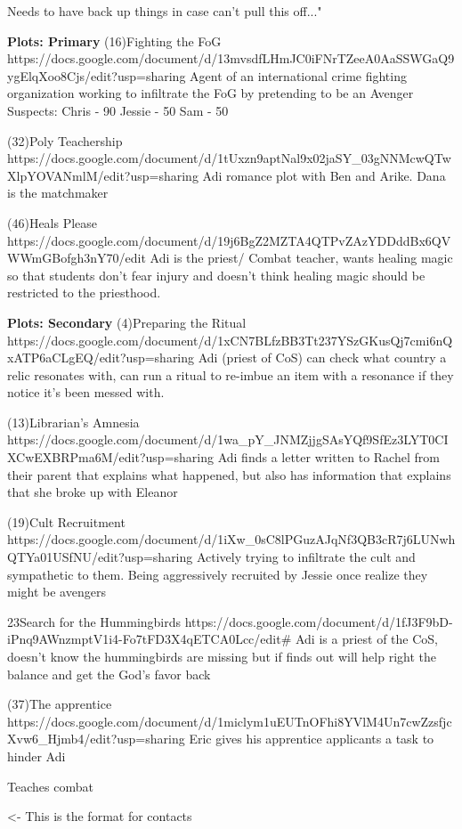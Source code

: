 \documentclass[char]{GL2020}
\begin{document}
Needs to have back up things in case can't pull this off..."

\textbf{Plots: Primary}
(16)Fighting the FoG
https://docs.google.com/document/d/13mvsdfLHmJC0iFNrTZeeA0AaSSWGaQ9ygElqXoo8Cjs/edit?usp=sharing
Agent of an international crime fighting organization working to infiltrate the FoG by pretending to be an Avenger
Suspects:
Chris - 90%
Jessie - 50%
Sam - 50%

(32)Poly Teachership
https://docs.google.com/document/d/1tUxzn9aptNal9x02jaSY_03gNNMcwQTwXlpYOVANmlM/edit?usp=sharing
Adi romance plot with Ben and Arike.  Dana is the matchmaker

(46)Heals Please
https://docs.google.com/document/d/19j6BgZ2MZTA4QTPvZAzYDDddBx6QVWWmGBofgh3nY70/edit
Adi is the priest/ Combat teacher, wants healing magic so that students don’t fear injury and doesn't think healing magic should be restricted to the priesthood.

\textbf{Plots: Secondary}
(4)Preparing the Ritual
https://docs.google.com/document/d/1xCN7BLfzBB3Tt237YSzGKusQj7cmi6nQxATP6aCLgEQ/edit?usp=sharing
Adi (priest of CoS) can check what country a relic resonates with, can run a ritual to re-imbue an item with a resonance if they notice it’s been messed with.

(13)Librarian's Amnesia
https://docs.google.com/document/d/1wa_pY_JNMZjjgSAsYQf9SfEz3LYT0CIXCwEXBRPma6M/edit?usp=sharing
Adi finds a letter written to Rachel from their parent that explains what happened, but also has information that explains that she broke up with Eleanor

(19)Cult Recruitment
https://docs.google.com/document/d/1iXw_0sC8lPGuzAJqNf3QB3cR7j6LUNwhQTYa01USfNU/edit?usp=sharing
Actively trying to infiltrate the cult and sympathetic to them.  Being aggressively recruited by Jessie once realize they might be avengers

23Search for the Hummingbirds
https://docs.google.com/document/d/1fJ3F9bD-iPnq9AWnzmptV1i4-Fo7tFD3X4qETCA0Lcc/edit#
Adi is a priest of the CoS, doesn't know the hummingbirds are missing but if finds out will help right the balance and get the God's favor back

(37)The apprentice
https://docs.google.com/document/d/1miclym1uEUTnOFhi8YVlM4Un7cwZzsfjcXvw6_Hjmb4/edit?usp=sharing
Eric gives his apprentice applicants a task to hinder Adi

Teaches combat

\begin{itemz}[Goals]
	\item 
\end{itemz}

\begin{itemz}[Notes]
	\item 
\end{itemz}

\begin{contacts}
	\contact{\cTest{}} <- This is the format for contacts 
\end{contacts}
\end{document}
